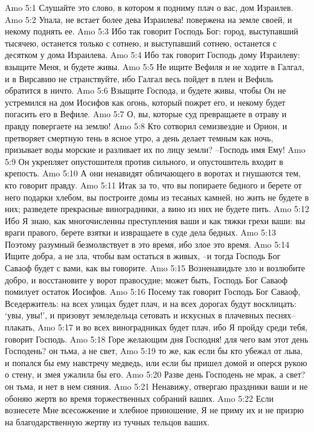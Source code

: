 Amo 5:1  Слушайте это слово, в котором я подниму плач о вас, дом Израилев.
Amo 5:2  Упала, не встает более дева Израилева! повержена на земле своей, и некому поднять ее.
Amo 5:3  Ибо так говорит Господь Бог: город, выступавший тысячею, останется только с сотнею, и выступавший сотнею, останется с десятком у дома Израилева.
Amo 5:4  Ибо так говорит Господь дому Израилеву: взыщите Меня, и будете живы.
Amo 5:5  Не ищите Вефиля и не ходите в Галгал, и в Вирсавию не странствуйте, ибо Галгал весь пойдет в плен и Вефиль обратится в ничто.
Amo 5:6  Взыщите Господа, и будете живы, чтобы Он не устремился на дом Иосифов как огонь, который пожрет его, и некому будет погасить его в Вефиле.
Amo 5:7  О, вы, которые суд превращаете в отраву и правду повергаете на землю!
Amo 5:8  Кто сотворил семизвездие и Орион, и претворяет смертную тень в ясное утро, а день делает темным как ночь, призывает воды морские и разливает их по лицу земли? --Господь имя Ему!
Amo 5:9  Он укрепляет опустошителя против сильного, и опустошитель входит в крепость.
Amo 5:10  А они ненавидят обличающего в воротах и гнушаются тем, кто говорит правду.
Amo 5:11  Итак за то, что вы попираете бедного и берете от него подарки хлебом, вы построите домы из тесаных камней, но жить не будете в них; разведете прекрасные виноградники, а вино из них не будете пить.
Amo 5:12  Ибо Я знаю, как многочисленны преступления ваши и как тяжки грехи ваши: вы враги правого, берете взятки и извращаете в суде дела бедных.
Amo 5:13  Поэтому разумный безмолвствует в это время, ибо злое это время.
Amo 5:14  Ищите добра, а не зла, чтобы вам остаться в живых, --и тогда Господь Бог Саваоф будет с вами, как вы говорите.
Amo 5:15  Возненавидьте зло и возлюбите добро, и восстановите у ворот правосудие; может быть, Господь Бог Саваоф помилует остаток Иосифов.
Amo 5:16  Посему так говорит Господь Бог Саваоф, Вседержитель: на всех улицах будет плач, и на всех дорогах будут восклицать: `увы, увы!', и призовут земледельца сетовать и искусных в плачевных песнях--плакать,
Amo 5:17  и во всех виноградниках будет плач, ибо Я пройду среди тебя, говорит Господь.
Amo 5:18  Горе желающим дня Господня! для чего вам этот день Господень? он тьма, а не свет,
Amo 5:19  то же, как если бы кто убежал от льва, и попался бы ему навстречу медведь, или если бы пришел домой и оперся рукою о стену, и змея ужалила бы его.
Amo 5:20  Разве день Господень не мрак, а свет? он тьма, и нет в нем сияния.
Amo 5:21  Ненавижу, отвергаю праздники ваши и не обоняю жертв во время торжественных собраний ваших.
Amo 5:22  Если вознесете Мне всесожжение и хлебное приношение, Я не приму их и не призрю на благодарственную жертву из тучных тельцов ваших.
